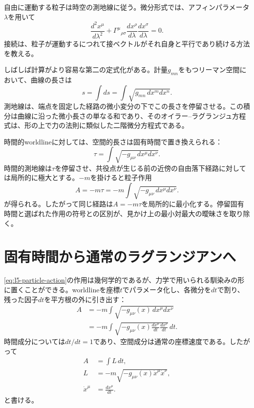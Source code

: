 自由に運動する粒子は時空の測地線に従う。微分形式では、アフィンパラメータ\(\lambda\)を用いて
\begin{equation}
\frac{d^2x^\mu}{d\lambda^2}
+\Gamma^\mu{}_{\rho\sigma}
\frac{dx^\rho}{d\lambda}
\frac{dx^\sigma}{d\lambda}=0.
\label{eq:l5-geodesic}
\end{equation}
接続は、粒子が運動するにつれて接ベクトルがそれ自身と平行であり続ける方法を教える。

しばしば計算がより容易な第二の定式化がある。計量\(g_{mn}\)をもつリーマン空間において、曲線の長さは
\begin{equation}
s=\int ds
=\int\sqrt{g_{mn}\,dx^m dx^n}.
\label{eq:l5-spatial-length}
\end{equation}
測地線は、端点を固定した経路の微小変分の下でこの長さを停留させる。この積分は曲線に沿った微小長さの単なる和であり、そのオイラー--ラグランジュ方程式は、形の上で力の法則に類似した二階微分方程式である。

時間的worldlineに対しては、空間的長さは固有時間で置き換えられる：
\begin{equation}
\tau
=\int\sqrt{-g_{\mu\nu}\,dx^\mu dx^\nu}.
\label{eq:l5-proper-time-functional}
\end{equation}
時間的測地線は\(\tau\)を停留させ、共役点が生じる前の近傍の自由落下経路に対しては局所的に極大とする。\(-m\)を掛けると粒子作用
\begin{equation}
A=-m\tau
=-m\int\sqrt{-g_{\mu\nu}\,dx^\mu dx^\nu}.
\label{eq:l5-particle-action}
\end{equation}
が得られる。したがって同じ経路は\(A=-m\tau\)を局所的に最小化する。停留固有時間と選ばれた作用の符号との区別が、見かけ上の最小対最大の曖昧さを取り除く。

\section{固有時間から通常のラグランジアンへ}

\eqref{eq:l5-particle-action}の作用は幾何学的であるが、力学で用いられる馴染みの形に置くことができる。worldlineを座標\(t\)でパラメータ化し、各微分を\(dt\)で割り、残った因子\(dt\)を平方根の外に引き出す：
\begin{align}
A
&=-m\int\sqrt{-g_{\mu\nu}(x)\,dx^\mu dx^\nu}\\
&=-m\int
\sqrt{-g_{\mu\nu}(x)
\frac{dx^\mu}{dt}\frac{dx^\nu}{dt}}\,dt.
\label{eq:l5-action-t}
\end{align}
時間成分については\(dt/dt=1\)であり、空間成分は通常の座標速度である。したがって
\begin{equation}
\begin{aligned}
A&=\int L\,dt,\\
L&=-m\sqrt{-g_{\mu\nu}(x)\dot x^\mu\dot x^\nu},\\
\dot x^\mu&=\frac{dx^\mu}{dt}.
\end{aligned}
\label{eq:l5-relativistic-lagrangian}
\end{equation}
と書ける。

